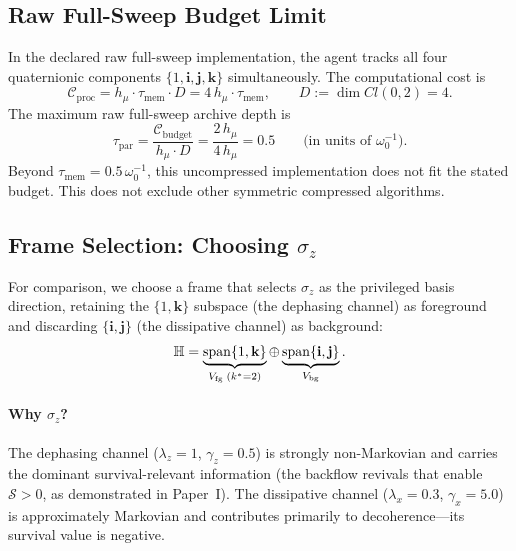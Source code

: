 \documentclass[12pt,a4paper,openany]{book}
\begin{document}
\subsection{Raw Full-Sweep Budget Limit}
\label{T-II-subsec:unbroken}

In the declared raw full-sweep implementation, the agent tracks all four
quaternionic components
$\{1, \mathbf{i}, \mathbf{j}, \mathbf{k}\}$
simultaneously.
The computational cost is
\begin{equation}
\label{T-II-eq:cost_full}
\mathcal{C}_{\mathrm{proc}}
= h_\mu \cdot \tau_{\mathrm{mem}} \cdot D
= 4\,h_\mu \cdot \tau_{\mathrm{mem}},
\qquad D := \dim Cl(0,2) = 4.
\end{equation}
The maximum raw full-sweep archive depth is
\begin{equation}
\label{T-II-eq:t_par_example}
\tau_{\mathrm{par}}
= \frac{\mathcal{C}_{\mathrm{budget}}}
       {h_\mu \cdot D}
= \frac{2\,h_\mu}{4\,h_\mu} = 0.5
\qquad\text{(in units of $\omega_0^{-1}$)}.
\end{equation}
Beyond $\tau_{\mathrm{mem}} = 0.5\,\omega_0^{-1}$,
this uncompressed implementation does not fit the stated budget.  This
does not exclude other symmetric compressed algorithms.

\subsection{Frame Selection: Choosing $\sigma_z$}
\label{T-II-subsec:choosing}

For comparison, we choose a frame that selects $\sigma_z$
as the privileged basis direction,
retaining the $\{1, \mathbf{k}\}$ subspace (the dephasing
channel) as foreground and discarding
$\{\mathbf{i}, \mathbf{j}\}$ (the dissipative channel)
as background:
\begin{equation}
\label{T-II-eq:decomp_example}
\mathbb{H}
= \underbrace{\mathrm{span}\{1, \mathbf{k}\}}_{%
  V_{\mathrm{fg}}\; (k^* = 2)}
\oplus
\underbrace{\mathrm{span}\{\mathbf{i}, \mathbf{j}\}}_{%
  V_{\mathrm{bg}}}.
\end{equation}

\paragraph{Why $\sigma_z$?}
The dephasing channel ($\lambda_z = 1$, $\gamma_z = 0.5$)
is strongly non-Markovian and carries the dominant
survival-relevant information (the backflow revivals that
enable $\mathcal{S} > 0$, as demonstrated in Paper~I).
The dissipative channel ($\lambda_x = 0.3$, $\gamma_x = 5.0$)
is approximately Markovian and contributes primarily to
decoherence---its survival value is negative.
\end{document}
